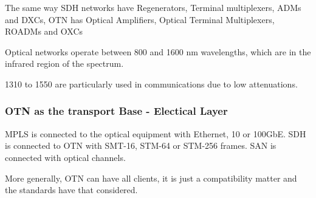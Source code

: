 The same way SDH networks have Regenerators, Terminal multiplexers, ADMs and DXCs, OTN has Optical Amplifiers, Optical Terminal Multiplexers, ROADMs and OXCs


Optical networks operate between 800 and 1600 nm wavelengths, which are in the infrared region of the spectrum.

1310 to 1550 are particularly used in communications due to low attenuations. 


\subsubsection{OTN as the transport Base - Electical Layer}

MPLS is connected to the optical equipment with Ethernet, 10 or 100GbE.
SDH is connected to OTN with SMT-16, STM-64 or STM-256 frames.
SAN is connected with optical channels.


More generally, OTN can have all clients, it is just a compatibility matter and the standards have that considered.



